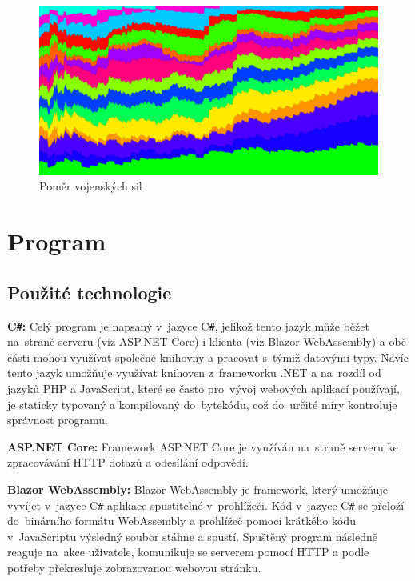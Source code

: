 \documentclass[a4paper,12pt]{article}
\def\CS{C\texttt{\#}}
\begin{document}
\begin{figure}[H]
	\includegraphics[width=\textwidth]{LayerGraph.png}
	\caption{Poměr vojenských sil}
	\label{graph3}
\end{figure}

\section{Program}
\subsection{Použité technologie}
\textbf{\CS{}: }Celý program je napsaný v~jazyce \CS{}, jelikož tento jazyk může běžet na~straně serveru (viz ASP.NET Core) i klienta (viz Blazor WebAssembly) a obě části mohou využívat společné knihovny a pracovat s~týmiž datovými typy. Navíc tento jazyk umožňuje využívat knihoven z~frameworku .NET a na~rozdíl od jazyků PHP a JavaScript, které se často pro~vývoj webových aplikací používají, je staticky typovaný a kompilovaný do~bytekódu, což do~určité míry kontroluje správnost programu.

\textbf{ASP.NET Core: }Framework ASP.NET Core je využíván na~straně serveru ke zpracovávání HTTP dotazů a odesílání odpovědí.

\textbf{Blazor WebAssembly: }Blazor WebAssembly je framework, který umožňuje vyvíjet v~jazyce \CS{} aplikace spustitelné v~prohlížeči. Kód v~jazyce \CS{} se přeloží do~binárního formátu WebAssembly a prohlížeč pomocí krátkého kódu v~JavaScriptu výsledný soubor stáhne a spustí. Spuštěný program následně reaguje na~akce uživatele, komunikuje se serverem pomocí HTTP a podle potřeby překresluje zobrazovanou webovou stránku.
\end{document}

